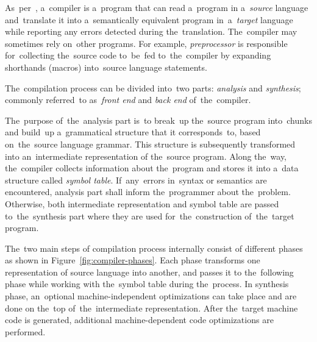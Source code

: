 \documentclass[
  digital, %
  table,   %
  lof,     %
  lot,     %
  oneside,
]{fithesis3}
\begin{document}
As~per~\cite{dragon-book}, a~compiler is a~program that can read a~program in a~\textit{source} language and~translate it into a~semantically equivalent program in~a~\textit{target} language while reporting any errors detected during the~translation. The~compiler may sometimes rely on~other programs. For example, \textit{preprocessor} is responsible for~collecting the~source code to~be~fed to~the~compiler by expanding shorthands (macros) into~source language statements. 

The~compilation process can be divided into~two parts: \textit{analysis} and \textit{synthesis}; commonly referred~to as~\textit{front end} and \textit{back end} of~the~compiler.

The~purpose of~the~analysis part is~to break~up the~source program into~chunks and build~up a~grammatical structure that it corresponds~to, based on~the~source language grammar. This structure is subsequently transformed into an~intermediate representation of the~source program. Along the~way, the~compiler collects information about the~program and stores it into a~data structure called \textit{symbol table}. If~any~errors in~syntax or semantics are encountered, analysis part shall inform the~programmer about the~problem. Otherwise, both intermediate representation and symbol table are passed to~the~synthesis part where they are used for~the~construction of~the~target program.

The~two main steps of compilation process internally consist of different phases as shown in Figure~\ref{fig:compiler-phases}. Each phase transforms one representation of source language into another, and passes it to the~following phase while working with the~symbol table during the~process. In synthesis phase, an~optional machine-independent optimizations can take place and are done on the~top of~the~intermediate representation. After the~target machine code is generated, additional machine-dependent code optimizations are performed.
\end{document}
